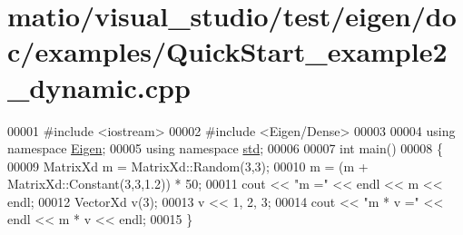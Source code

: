 \hypertarget{matio_2visual__studio_2test_2eigen_2doc_2examples_2_quick_start__example2__dynamic_8cpp_source}{}\section{matio/visual\+\_\+studio/test/eigen/doc/examples/\+Quick\+Start\+\_\+example2\+\_\+dynamic.cpp}
\label{matio_2visual__studio_2test_2eigen_2doc_2examples_2_quick_start__example2__dynamic_8cpp_source}

\begin{DoxyCode}
00001 \textcolor{preprocessor}{#include <iostream>}
00002 \textcolor{preprocessor}{#include <Eigen/Dense>}
00003 
00004 \textcolor{keyword}{using namespace }\hyperlink{namespace_eigen}{Eigen};
00005 \textcolor{keyword}{using namespace }\hyperlink{namespacestd}{std};
00006 
00007 \textcolor{keywordtype}{int} main()
00008 \{
00009   MatrixXd m = MatrixXd::Random(3,3);
00010   m = (m + MatrixXd::Constant(3,3,1.2)) * 50;
00011   cout << \textcolor{stringliteral}{"m ="} << endl << m << endl;
00012   VectorXd v(3);
00013   v << 1, 2, 3;
00014   cout << \textcolor{stringliteral}{"m * v ="} << endl << m * v << endl;
00015 \}
\end{DoxyCode}
